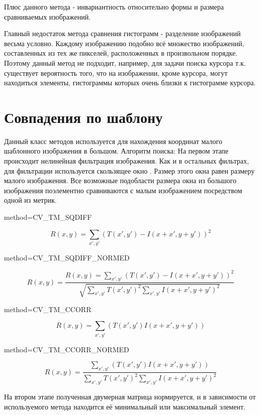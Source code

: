 \documentclass[oneside,final,14pt]{extreport}
\begin{document}
Плюс данного метода - инвариантность относительно формы и размера сравниваемых изображений.

Главный недостаток метода сравнения гистограмм -   разделение изображений весьма условно. Каждому изображению подобно всё множество изображений, составленных из тех же пикселей, расположенных в произвольном порядке. Поэтому данный метод не подходит, например,  для задачи поиска курсора т.к. существует вероятность того, что на изображении, кроме курсора, могут находиться элементы, гистограммы которых очень близки к гистограмме курсора.   

\section{Совпадения по шаблону}
Данный класс методов используется для нахождения координат малого шаблонного изображения в большом. Алгоритм поиска:
На первом этапе происходит нелинейная фильтрация изображения. Как и в остальных фильтрах, для фильтрации используется скользящее окно \cite{Dup:cousache}. Размер этого окна равен размеру малого изображения. Все возможные подобласти размера окна  из большого изображения поэлементно сравниваются с малым изображением посредством одной из метрик.   

 method=CV\_TM\_SQDIFF

$$
R(x,y)
=
\sum_{x',y'}
(T(x',y')-I(x+x',y+y'))^2
$$ 

method=CV\_TM\_SQDIFF\_NORMED

$$
R(x,y)
=
\frac{
R(x,y)
=
\sum_{x',y'}
(T(x',y')-I(x+x',y+y'))^2
}
{
\sqrt{
	\sum_{x',y'}
	T(x',y')^2
	\sum_{x',y'}
	I(x+x',y+y')^2
	}
}
$$

method=CV\_TM\_CCORR

$$
R(x,y)
=
\sum_{x',y'}
( T(x',y')I(x+x',y+y'))
$$

method=CV\_TM\_CCORR\_NORMED

$$
R(x,y)
=
\frac{
	\sum_{x',y'}
	( T(x',y')I(x+x',y+y'))
}
{
	\sum_{x',y'}
	T(x',y')^2
	\sum_{x',y'}
	I(x+x',y+y')^2
}
$$

На втором этапе полученная двумерная матрица нормируется, и в зависимости от используемого метода находится её минимальный или максимальный элемент.
\end{document}
